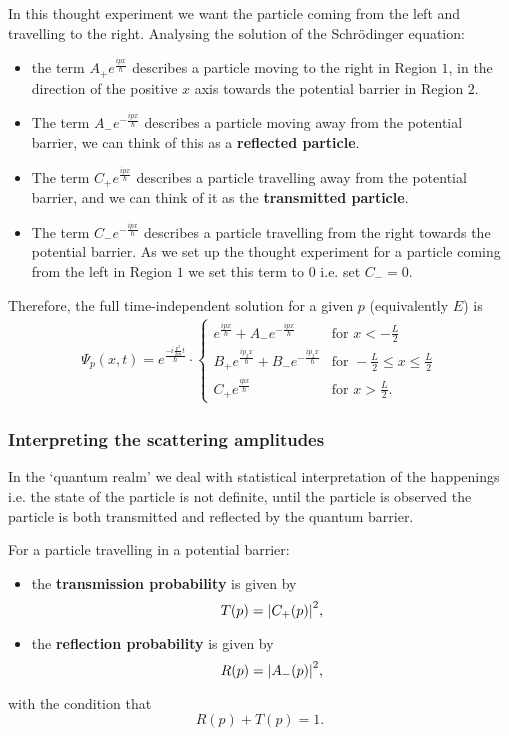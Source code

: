 \documentclass[12pt, a4paper]{article}
\begin{document}
In this thought experiment we want the particle coming from the left and travelling to the right. Analysing the solution of the Schrödinger equation:
\begin{itemize}
    \item the term \(A_{+} e^{\frac{ipx}{\hbar}}\) describes a particle moving to the right in Region \(1\), in the direction of the positive \(x\) axis towards the potential barrier in Region \(2\).
    \item The term \(A_{-} e^{-\frac{ipx}{\hbar}}\) describes a particle moving away from the potential barrier, we can think of this as a \textbf{reflected particle}.
    \item The term \(C_{+} e^{\frac{ipx}{\hbar}}\) describes a particle travelling away from the potential barrier, and we can think of it as the \textbf{transmitted particle}.
    \item The term \(C_{-} e^{-\frac{ipx}{\hbar}}\) describes a particle travelling from the right towards the potential barrier. As we set up the thought experiment for a particle coming from the left in Region \(1\) we set this term to \(0\) i.e. set \(C_{-} = 0\).
\end{itemize}

Therefore, the full time-independent solution for a given \(p\) (equivalently \(E\)) is 
\[\begin{aligned}
    \Psi_p(x,t) = e^{\frac{-i \frac{p^2}{2m} t }{\hbar}} \cdot \begin{cases}
        e^{\frac{ipx}{\hbar}} + A_{-}e^{-\frac{ipx}{\hbar}} &\text{for } x < - \frac{L}{2} \\
        B_{+} e^{\frac{ip_2 x}{\hbar}} + B_{-}e^{-\frac{ip_2 x}{\hbar}} &\text{for } - \frac{L}{2} \leq x \leq \frac{L}{2}\\
        C_{+} e^{\frac{ipx}{\hbar}}  &\text{for } x > \frac{L}{2}.
    \end{cases}
\end{aligned}\]

\subsubsection{Interpreting the scattering amplitudes}

In the `quantum realm' we deal with statistical interpretation of the happenings i.e. the state of the particle is not definite, until the particle is observed the particle is both transmitted and reflected by the quantum barrier. 

\begin{mdthm}
    For a particle travelling in a potential barrier:
    \begin{itemize}
        \item the \textbf{transmission probability} is given by 
        \[T(p) = \abs{C_{+}(p)}^2,\]
        \item the \textbf{reflection probability} is given by 
        \[R(p) = \abs{A_{-}(p)}^2,\]
    \end{itemize}
    with the condition that 
    \[R(p)+T(p)=1.\]
\end{mdthm}
\end{document}
